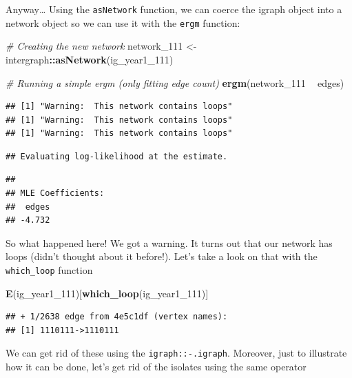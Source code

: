 \documentclass[]{book}
\newenvironment{Shaded}{\begin{snugshade}}{\end{snugshade}}
\newcommand{\KeywordTok}[1]{\textcolor[rgb]{0.13,0.29,0.53}{\textbf{#1}}}
\newcommand{\DecValTok}[1]{\textcolor[rgb]{0.00,0.00,0.81}{#1}}
\newcommand{\StringTok}[1]{\textcolor[rgb]{0.31,0.60,0.02}{#1}}
\newcommand{\CommentTok}[1]{\textcolor[rgb]{0.56,0.35,0.01}{\textit{#1}}}
\newcommand{\OperatorTok}[1]{\textcolor[rgb]{0.81,0.36,0.00}{\textbf{#1}}}
\newcommand{\NormalTok}[1]{#1}
\theoremstyle{definition}
\theoremstyle{definition}
\theoremstyle{definition}
\theoremstyle{remark}
\begin{document}
Anyway\ldots{} Using the \texttt{asNetwork} function, we can coerce the
igraph object into a network object so we can use it with the
\texttt{ergm} function:

\begin{Shaded}
\begin{Highlighting}[]
\CommentTok{# Creating the new network}
\NormalTok{network_}\DecValTok{111}\NormalTok{ <-}\StringTok{ }\NormalTok{intergraph}\OperatorTok{::}\KeywordTok{asNetwork}\NormalTok{(ig_year1_}\DecValTok{111}\NormalTok{)}

\CommentTok{# Running a simple ergm (only fitting edge count)}
\KeywordTok{ergm}\NormalTok{(network_}\DecValTok{111} \OperatorTok{~}\StringTok{ }\NormalTok{edges)}
\end{Highlighting}
\end{Shaded}

\begin{verbatim}
## [1] "Warning:  This network contains loops"
## [1] "Warning:  This network contains loops"
## [1] "Warning:  This network contains loops"
\end{verbatim}

\begin{verbatim}
## Evaluating log-likelihood at the estimate.
\end{verbatim}

\begin{verbatim}
## 
## MLE Coefficients:
##  edges  
## -4.732
\end{verbatim}

So what happened here! We got a warning. It turns out that our network
has loops (didn't thought about it before!). Let's take a look on that
with the \texttt{which\_loop} function

\begin{Shaded}
\begin{Highlighting}[]
\KeywordTok{E}\NormalTok{(ig_year1_}\DecValTok{111}\NormalTok{)[}\KeywordTok{which_loop}\NormalTok{(ig_year1_}\DecValTok{111}\NormalTok{)]}
\end{Highlighting}
\end{Shaded}

\begin{verbatim}
## + 1/2638 edge from 4e5c1df (vertex names):
## [1] 1110111->1110111
\end{verbatim}

We can get rid of these using the \texttt{igraph::-.igraph}. Moreover,
just to illustrate how it can be done, let's get rid of the isolates
using the same operator
\end{document}
